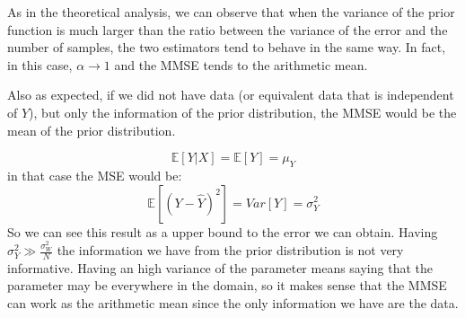 As in the theoretical analysis, we can observe that when the variance of the prior function is much larger than the ratio between the variance of the error and the number of samples, the two estimators tend to behave in the same way. In fact, in this case, $\alpha\to 1$ and the MMSE tends to the arithmetic mean.

Also as expected, if we did not have data (or equivalent data that is independent of $Y$), but only the information of the prior distribution, the MMSE would be the mean of the prior distribution.

$$
    \mathbb E[Y|X]=\mathbb E[Y]=\mu_Y
$$
in that case the MSE would be:
$$
    \mathbb E[(Y-\hat Y)^2]=Var[Y]=\sigma_Y^2
$$
So we can see this result as a upper bound to the error we can obtain.
Having  $\sigma^2_Y \gg \frac{\sigma^2_W}N$ the information we have from the prior distribution is not very informative. Having an high variance of the parameter means saying that the parameter may be everywhere in the domain, so it makes sense that the MMSE can work as the arithmetic mean since the only information we have are the data.
